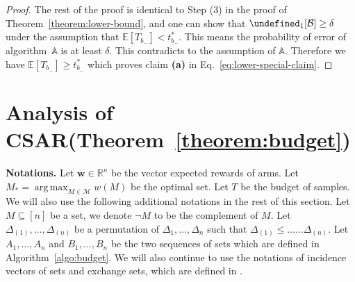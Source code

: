 \documentclass{article}
\newcommand{\AlgorithmBud}{{\small \textsf{CSAR}}\xspace}
\newcommand{\Problem}{{CPE}\xspace}
\newcommand{\E}{\mathbb E}
\newcommand{\M}{\mathcal M}
\newcommand{\RR}{\mathbb R}
\DeclareMathOperator*{\argmax}{arg\,max}
\let\Pr\undefined
\DeclareMathOperator{\Pr}{Pr}
\renewcommand{\vec}[1]{\boldsymbol{#1}}
\begin{document}
\begin{proof}
The rest of the proof is identical to Step (3) in the proof of Theorem~\ref{theorem:lower-bound}, and one can show that $\Pr_1[\mathcal B] \ge \delta$ under the assumption that $\E[T_{b_-}] < t_{b_-}^*$. 
This means the probability of error of algorithm~$\mathbb A$ is at least $\delta$. 
This contradicts to the assumption of $\mathbb A$. 
Therefore we have $\E[T_{b_-}]\ge t_{b_-}^*$ which proves claim \textbf{(a)} in Eq.~\eqref{eq:lower-special-claim}.
\end{proof}


\section{Analysis of \AlgorithmBud (Theorem~\ref{theorem:budget})}
\label{section:fixed-budget-proof}

\textbf{Notations.}
Let $\vec w \in \RR^n$ be the vector expected rewards of arms.
Let $M_* = \argmax_{M\in \M} w(M)$ be the optimal set.
Let $T$ be the budget of samples.
We will also use the following additional notations in the rest of this section.
Let $M\subseteq [n]$ be a set, we denote $\neg M$ to be the complement of $M$.
Let $\Delta_{(1)},\ldots,\Delta_{(n)}$ be a permutation of $\Delta_1,\ldots,\Delta_n$ such that
$\Delta_{(1)} \le \ldots \ldots \Delta_{(n)}$.
Let $A_1,\ldots,A_n$ and $B_1,\ldots, B_n$ be the two sequences of sets which are defined in Algorithm~\ref{algo:budget}.
We will also continue to use the notations of incidence vectors of sets and exchange sets, which are defined in .
\end{document}
